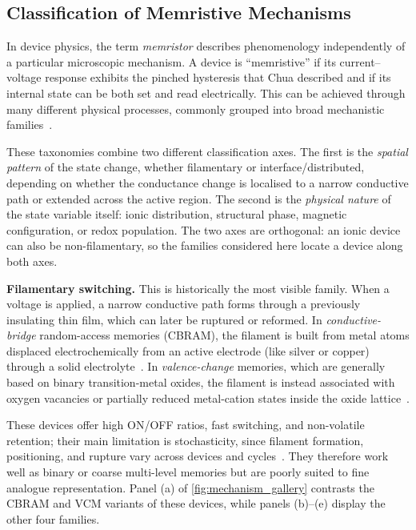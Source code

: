 \documentclass[12pt, twoside]{report}
\begin{document}
\subsection{Classification of Memristive Mechanisms}\label{subsec:memristor_classes}

In device physics, the term \textit{memristor} describes phenomenology independently of a particular microscopic mechanism. A device is ``memristive'' if its current--voltage response exhibits the pinched hysteresis that Chua described and if its internal state can be both set and read electrically. This can be achieved through many different physical processes, commonly grouped into broad mechanistic families~\cite{YangStrukovStewart2013, IelminiWong2018}.

These taxonomies combine two different classification axes. The first is the \textit{spatial pattern} of the state change, whether filamentary or interface/distributed, depending on whether the conductance change is localised to a narrow conductive path or extended across the active region. The second is the \textit{physical nature} of the state variable itself: ionic distribution, structural phase, magnetic configuration, or redox population. The two axes are orthogonal: an ionic device can also be non-filamentary, so the families considered here locate a device along both axes.

\textbf{Filamentary switching.} This is historically the most visible family. When a voltage is applied, a narrow conductive path forms through a previously insulating thin film, which can later be ruptured or reformed. In \textit{conductive-bridge} random-access memories (CBRAM), the filament is built from metal atoms displaced electrochemically from an active electrode (like silver or copper) through a solid electrolyte~\cite{Valov2011, WaserAono2007}. In \textit{valence-change} memories, which are generally based on binary transition-metal oxides, the filament is instead associated with oxygen vacancies or partially reduced metal-cation states inside the oxide lattice~\cite{Yang2008}.

These devices offer high ON/OFF ratios, fast switching, and non-volatile retention; their main limitation is stochasticity, since filament formation, positioning, and rupture vary across devices and cycles~\cite{Sun2019}. They therefore work well as binary or coarse multi-level memories but are poorly suited to fine analogue representation. Panel (a) of \cref{fig:mechanism_gallery} contrasts the CBRAM and VCM variants of these devices, while panels (b)--(e) display the other four families.
\end{document}
